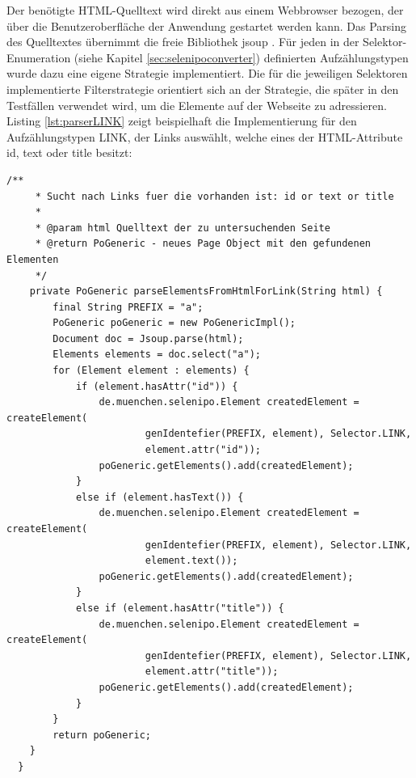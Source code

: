 Der benötigte HTML-Quelltext wird direkt aus einem Webbrowser bezogen, der über die Benutzeroberfläche der Anwendung gestartet werden kann.
Das Parsing des Quelltextes übernimmt die freie Bibliothek jsoup \cite{hedley_jsoup_2015}.
Für jeden in der Selektor-Enumeration (siehe Kapitel \ref{sec:selenipoconverter}) definierten Aufzählungstypen wurde dazu eine eigene Strategie implementiert. 
Die für die jeweiligen Selektoren implementierte Filterstrategie orientiert sich an der Strategie, die später in den Testfällen verwendet wird, um die Elemente auf der Webseite zu adressieren.\\
Listing \ref{lst:parserLINK} zeigt beispielhaft die Implementierung für den Aufzählungstypen LINK, der Links auswählt, welche eines der HTML-Attribute id, text oder title besitzt:
\begin{lstlisting}[caption={Parser für den Aufzählungstypen LINK},label={lst:parserLINK}]
 	/**
	 * Sucht nach Links fuer die vorhanden ist: id or text or title
	 *
	 * @param html Quelltext der zu untersuchenden Seite
	 * @return PoGeneric - neues Page Object mit den gefundenen Elementen
	 */
	private PoGeneric parseElementsFromHtmlForLink(String html) {
		final String PREFIX = "a";
		PoGeneric poGeneric = new PoGenericImpl();
		Document doc = Jsoup.parse(html);
		Elements elements = doc.select("a");
		for (Element element : elements) {
			if (element.hasAttr("id")) {
				de.muenchen.selenipo.Element createdElement = createElement(
						genIdentefier(PREFIX, element), Selector.LINK,
						element.attr("id"));
				poGeneric.getElements().add(createdElement);
			}
			else if (element.hasText()) {
				de.muenchen.selenipo.Element createdElement = createElement(
						genIdentefier(PREFIX, element), Selector.LINK,
						element.text());
				poGeneric.getElements().add(createdElement);
			}
			else if (element.hasAttr("title")) {
				de.muenchen.selenipo.Element createdElement = createElement(
						genIdentefier(PREFIX, element), Selector.LINK,
						element.attr("title"));
				poGeneric.getElements().add(createdElement);
			}
		}
		return poGeneric;
	}
  }
  
\end{lstlisting} 


